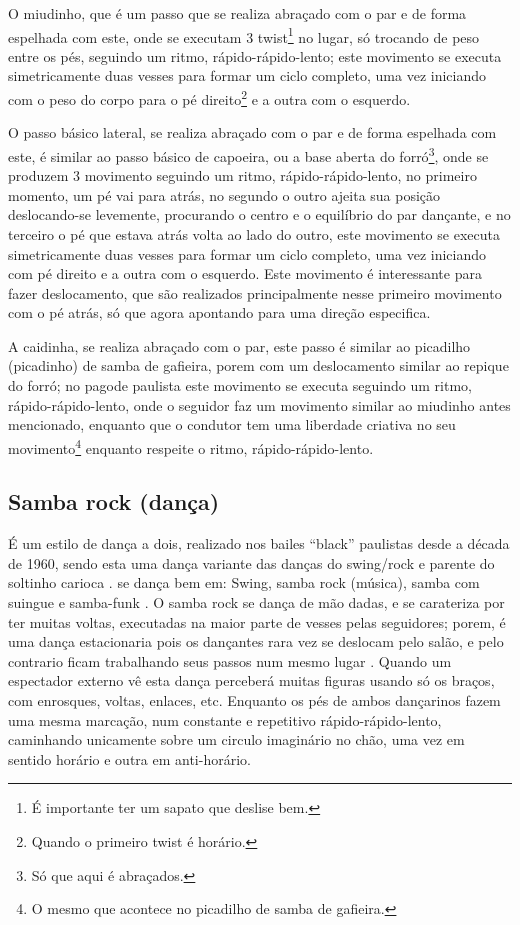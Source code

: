 O miudinho, que é um passo que se realiza abraçado com o par e de forma espelhada com este,
onde se executam 3 twist\footnote{É importante ter um sapato que deslise bem.} no lugar, 
só trocando de peso entre os pés, seguindo um ritmo, rápido-rápido-lento;
este movimento se executa simetricamente duas vesses para formar um ciclo completo,  
uma vez iniciando com o peso do corpo para o pé direito\footnote{Quando o primeiro twist é horário.} e a outra com o esquerdo.

O passo básico lateral, se realiza abraçado com o par  e de forma espelhada com este, 
é similar ao passo básico de capoeira,
ou a base aberta do forró\footnote{Só que aqui é abraçados.},
onde se produzem 3 movimento seguindo um ritmo, rápido-rápido-lento,
no primeiro momento, um pé vai para atrás, 
no segundo o outro ajeita sua posição deslocando-se levemente, 
procurando o centro e o equilíbrio do par dançante, e
no terceiro o pé que estava atrás volta ao lado do outro,
este movimento se executa simetricamente duas vesses para formar um ciclo completo,  
uma vez iniciando com pé direito e a outra com o esquerdo.
Este movimento é interessante para fazer deslocamento, 
que são realizados principalmente nesse primeiro movimento com o pé atrás, 
só que agora apontando para uma direção especifica.

A caidinha, se realiza abraçado com o par, 
este passo é similar ao picadilho (picadinho) de samba de gafieira,
porem com um deslocamento similar ao repique do forró;
no pagode paulista este movimento se executa seguindo um ritmo, rápido-rápido-lento,
onde o seguidor faz um movimento similar ao miudinho antes mencionado,
enquanto que o condutor tem uma liberdade criativa no 
seu movimento\footnote{O mesmo que acontece no picadilho de samba de gafieira.} 
enquanto respeite o ritmo, rápido-rápido-lento.

\subsection{Samba rock (dança)}
É um estilo de dança a dois, realizado nos bailes ``black'' paulistas desde a década de 1960, 
sendo esta uma dança variante das danças do swing/rock e parente do soltinho carioca \cite[pp. 135]{perna2002samba}.
se dança bem em: Swing, samba rock (música), samba com suingue e samba-funk \cite[pp. 135,138]{perna2002samba}.
O samba rock se dança de mão dadas, e se carateriza por ter muitas voltas,
executadas na maior parte de vesses pelas  seguidores;
porem, é uma dança estacionaria pois os dançantes rara vez se deslocam pelo salão, 
e pelo contrario ficam trabalhando seus passos num mesmo lugar  \cite[pp. 135,138]{perna2002samba}.
Quando um espectador externo vê esta dança perceberá muitas figuras usando só os braços,
com enrosques, voltas, enlaces, etc.
Enquanto os pés de ambos dançarinos fazem uma mesma marcação, num constante e repetitivo rápido-rápido-lento,
caminhando unicamente sobre um circulo imaginário no chão, uma vez em sentido horário e outra em anti-horário.

